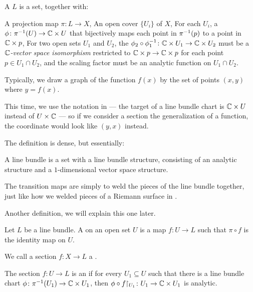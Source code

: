 \begin{definition}
	A  $L$ is a set, together with:
	\begin{itemize}
		\ii A projection map $\pi \colon L \to X$,
		\ii An open cover $\{ U_i \}$ of $X$,
		\ii For each $U_i$, a  $\phi \colon \pi^{-1}(U) \to \mathbb C \times U$
		that bijectively maps each point in $\pi^{-1}(p)$ to a point in $\mathbb C \times p$,
		\ii For two open sets $U_1$ and $U_2$, the  $\phi_2 \circ
		\phi_1^{-1} \colon \mathbb C \times U_1 \to \mathbb C \times U_2$ must be a \emph{$\mathbb C$-vector space
		isomorphism} restricted to $\mathbb C \times p \to \mathbb C \times p$ for each point $p \in U_1 \cap
		U_2$, and the scaling factor must be an analytic function on $U_1 \cap U_2$.
	\end{itemize}
\end{definition}

\begin{remark}[Warning]
	Typically, we draw a graph of the function $f(x)$ by the set of points $(x, y)$ where $y =
	f(x)$.

	This time, we use the notation in \cite{ref:miranda} --- the target of a line bundle chart is
	$\mathbb C \times U$ instead of $U \times \mathbb C$ ---
	so if we consider a section the generalization of a function, the
	coordinate would look like $(y, x)$ instead.
\end{remark}

The definition is dense, but essentially:
\begin{moral}
	A line bundle is a set with a line bundle structure, consisting of an analytic structure and a
	$1$-dimensional vector space structure.
\end{moral}
The transition maps are simply to weld the pieces of the line bundle together, just like how we
welded pieces of a Riemann surface in .

Another definition, we will explain this one later.
\begin{definition}
	Let $L$ be a line bundle. A  on an open set $U$
	is a map $f \colon U \to L$ such that $\pi \circ f$ is
	the identity map on $U$.

	We call a section $f \colon X \to L$ a .

	The section $f \colon U \to L$ is an  if for every $U_1 \subseteq U$
	such that there is a line bundle chart $\phi \colon \pi^{-1}(U_1) \to \mathbb C \times U_1$, then
	$\phi \circ f\restrict{U_1} \colon U_1 \to \CC \times U_1$ is analytic.
\end{definition}

